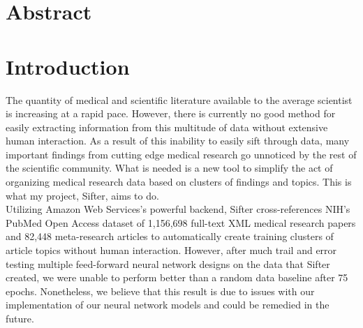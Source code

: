 \documentclass[12pt,twoside]{article}
\begin{document}



\section{Abstract}



\section{Introduction}

The quantity of medical and scientific literature available to the average scientist is increasing at a rapid pace. However, there is currently no good method for easily extracting information from this multitude of data without extensive human interaction. As a result of this inability to easily sift through data, many important findings from cutting edge medical research go unnoticed by the rest of the scientific community. What is needed is a new tool to simplify the act of organizing medical research data based on clusters of findings and topics. This is what my project, Sifter, aims to do.\\

Utilizing Amazon Web Services's powerful backend, Sifter cross-references NIH's PubMed Open Access dataset of 1,156,698 full-text XML medical research papers and 82,448 meta-research articles to automatically create training clusters of article topics without human interaction. However, after much trail and error testing multiple feed-forward neural network designs on the data that Sifter created, we were unable to perform better than a random data baseline after 75 epochs. Nonetheless, we believe that this result is due to issues with our implementation of our neural network models and could be remedied in the future. \\
\end{document}
